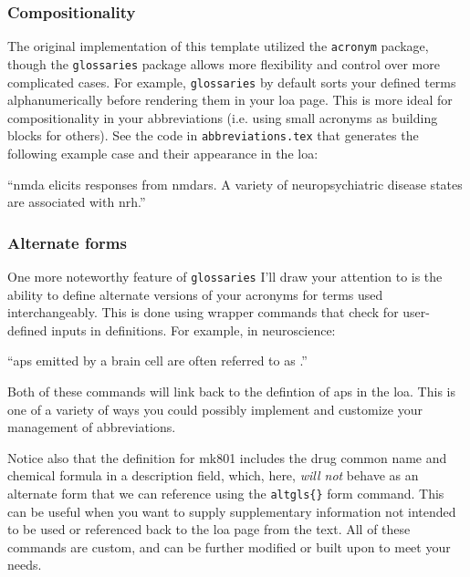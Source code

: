 \documentclass[../../main.tex]{subfiles}  %
\begin{document}
	\subsubsection{Compositionality}

	The original implementation of this template utilized the \verb|acronym| package, though the \verb|glossaries| package allows more flexibility and control over more complicated cases.
	For example, \verb|glossaries| by default sorts your defined terms alphanumerically before rendering them in your \gls{loa} page. 
	This is more ideal for compositionality in your abbreviations (i.e. using small acronyms as building blocks for others). 
	See the code in \verb|abbreviations.tex| that generates the following example case and their appearance in the \gls{loa}: 
	\begin{displayquote}  %
		``\gls{nmda} elicits responses from \glspl{nmdar}. 
		A variety of neuropsychiatric disease states are associated with \gls{nrh}.''	
	\end{displayquote}

	\subsubsection{Alternate forms}

	One more noteworthy feature of \verb|glossaries| I'll draw your attention to is the ability to define alternate versions of your acronyms for terms used interchangeably.
	This is done using wrapper commands that check for user-defined inputs in definitions.
	For example, in neuroscience: 
	
	\begin{displayquote}
		``\glspl{ap} emitted by a brain cell are often referred to as .''
	\end{displayquote}

	Both of these commands will link back to the defintion of \glspl{ap} in the \gls{loa}.
	This is one of a variety of ways you could possibly implement and customize your management of abbreviations.

	Notice also that the definition for \acrfull{mk801} includes the drug common name and chemical formula in a description field, which, here, \textit{will not} behave as an alternate form that we can reference using the \verb|altgls{}| form command.
	This can be useful when you want to supply supplementary information not intended to be used or referenced back to the \gls{loa} page from the text.
	All of these commands are custom, and can be further modified or built upon to meet your needs.
\end{document}
